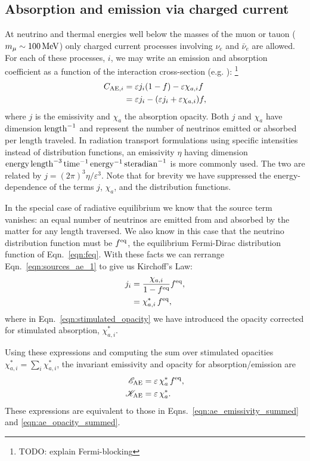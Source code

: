 \documentclass[aps,floatfix,prd,superscriptaddress,twocolumn]{revtex4-1}
\begin{document}
\subsection{Absorption and emission via charged current}
\label{ssec:sources_ae}
At neutrino and thermal energies well below the masses of the muon or tauon
($m_{\mu}\sim100\,{\rm MeV}$)
only charged current processes involving $\nu_e$ and $\bar{\nu}_e$ are allowed.
For each of these processes, $i$, we may write an emission and absorption
coefficient as a function of the interaction cross-section
(e.g. \cite[Eqn.~A5]{brue1985-core_collapse}):
\footnote{TODO: explain Fermi-blocking}
\begin{align}
  \label{eqn:sources_ae_1}
  C_{{\rm AE},i}
  &= \varepsilon j_i (1-f) - \varepsilon \chi_{a,i} f \\
  \label{eqn:sources_ae_2}
  &= \varepsilon j_i - (\varepsilon j_i+\varepsilon \chi_{a,i}) f,
\end{align}
where $j$ is the emissivity and $\chi_a$ the absorption opacity.
Both $j$ and $\chi_a$ have dimension ${\rm length}^{-1}$ and represent the
number of neutrinos emitted or absorbed per length traveled.
In radiation transport formulations using specific intensities instead of
distribution functions, an emissivity $\eta$ having dimension
${\rm energy}\,{\rm length}^{-3}\,{\rm time}^{-1}\,{\rm energy}^{-1}\,{\rm steradian}^{-1}$
is more commonly used.
The two are related by $j=(2\pi)^3\eta/\varepsilon^3$.
Note that for brevity we have suppressed the energy-dependence of
the terms $j$, $\chi_a$, and the distribution functions.

In the special case of radiative equilibrium we know that the source
term vanishes: an equal number of neutrinos are emitted from
and absorbed by the matter for any length traversed.
We also know in this case that the neutrino distribution function must be
$f^{\rm eq}$, the equilibrium Fermi-Dirac distribution function of
Eqn.~\ref{eqn:feq}.
With these facts we can rerrange Eqn.~\ref{eqn:sources_ae_1} to give us
Kirchoff's Law:
\begin{align}
  \label{eqn:kirchoffs_law}
  j_i &= \frac{\chi_{a,i}}{1-f^{\rm eq}}f^{\rm eq}, \\
  \label{eqn:stimulated_opacity}
  &= \chi^*_{a,i}\,f^{\rm eq},
\end{align}
where in Eqn.~\ref{eqn:stimulated_opacity} we have introduced the opacity
corrected for stimulated absorption, $\chi^*_{a,i}$.

Using these expressions and computing the sum over stimulated opacities
$\chi^*_{a,i}=\sum_i \chi^*_{a,i}$,
the invariant emissivity and opacity for absorption/emission are
\begin{align}
  \label{eqn:ae_emissivity_summed_2}
  \mathscr{E}_{{\rm AE}} &= \varepsilon \, \chi^*_a \, f^{\rm eq}, \\
  \label{eqn:ae_opacity_summed_2}
  \mathscr{K}_{{\rm AE}} &= \varepsilon \, \chi^*_a.
\end{align}
These expressions are equivalent to those in
Eqns.~\ref{eqn:ae_emissivity_summed} and \ref{eqn:ae_opacity_summed}.
\end{document}
